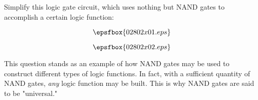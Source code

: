 

Simplify this logic gate circuit, which uses nothing but NAND gates to accomplish a certain logic function:

$$\epsfbox{02802x01.eps}$$







$$\epsfbox{02802x02.eps}$$







This question stands as an example of how NAND gates may be used to construct different types of logic functions.  In fact, with a sufficient quantity of NAND gates, {\it any} logic function may be built.  This is why NAND gates are said to be "universal."




